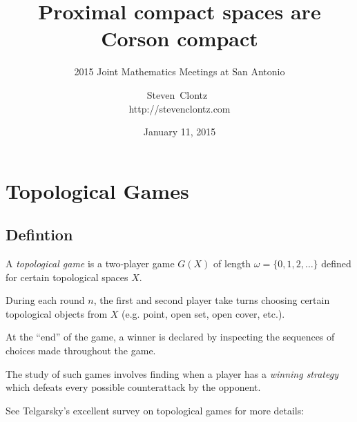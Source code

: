 \documentclass{beamer}
\title
{Proximal compact spaces are Corson compact}
\subtitle
{2015 Joint Mathematics Meetings at San Antonio} %
\author%
{Steven~Clontz~\\http://stevenclontz.com}%
\institute[Auburn University] %
{
  Department of Mathematics and Statistics\\
  Auburn University}
\date[15-01-11] %
{January 11, 2015}
\theoremstyle{definition}
\newcommand{\<}{\langle}
\renewcommand{\>}{\rangle}
\newcommand{\term}{\textit}
\begin{document}
\newcommand{\vspacing}{\vspace{1em}}
\newcommand{\vpause}{\pause\vspacing}

\begin{frame}
  \titlepage
\end{frame}

\section{Topological Games}

\subsection{Defintion}

\begin{frame}
  A \term{topological game} is a two-player game $G(X)$ of length
  $\omega=\{0,1,2,\dots\}$ defined for certain topological spaces $X$.

  \vpause

  During each round $n$, the first and second player take turns choosing
  certain topological objects from $X$ (e.g. point, open set, open cover, etc.).

  \vpause

  At the ``end'' of the game, a winner is declared by inspecting the sequences
  of choices made throughout the game.

  \vpause

  The study of such games involves finding when a player has a
  \term{winning strategy} which defeats every possible counterattack by
  the opponent.

  \vpause

  {\tiny See Telgarsky's excellent survey on topological games for more
  details: \cite{MR892457}}
\end{frame}




\end{document}
